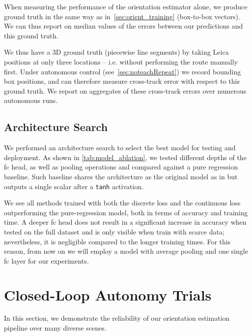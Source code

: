 \documentclass[conference]{ieeeconf}
\begin{document}
When measuring the performance of the orientation estimator alone, we produce ground truth in the same way as in~\cref{sec:orient_training} (box-to-box vectors).
We can thus report on median values of the errors between our predictions and this ground truth.

We thus have a 3D ground truth (piecewise line segments) by taking Leica positions at only three locations -- i.e. without performing the route manually first.
Under autonomous control (see~\cref{sec:noteachRepeat}) we record bounding box positions, and can therefore measure cross-track error with respect to this ground truth.
We report on aggregates of these cross-track errors over numerous autonomous runs.


\subsection{Architecture Search}

We performed an architecture search to select the best model for testing and deployment.
As shown in \cref{tab:model_ablation}, we tested different depths of the \gls{fc} head, as well as pooling operations and compared against a pure regression baseline.
Such baseline shares the architecture as the original model as in \cite{ruiz2018fine} but outputs a single scalar after a \texttt{tanh} activation.

We see all methods trained with both the discrete loss and the continuous loss outperforming the pure-regression model, both in terms of accuracy and training time.
A deeper \gls{fc} head does not result in a significant increase in accuracy when tested on the full dataset and is only visible when train with scarce data; nevertheless, it is negligible compared to the longer training times.
For this reason, from now on we will employ a model with average pooling and one single \gls{fc} layer for our experiments.

\section{Closed-Loop Autonomy Trials}%
\label{sec:openLoopResults}

In this section, we demonstrate the reliability of our orientation estimation pipeline over many diverse scenes.
\end{document}
